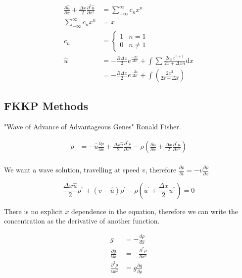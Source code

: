 \documentclass[a4paper]{article}
\begin{document}
\begin{align*}
 \frac{\partial \hat{u}}{\partial x} + \frac{\Delta x}{2} \frac{\partial ^2 \hat{u}}{\partial x^2} & = \sum _{- \infty} ^{\infty} c_n x^n \\ 
 \sum _{- \infty} ^{\infty} c_n x^n & = x \\
 c_n & =  \begin{cases}
1 & n = 1 \\
0 & n \neq 1		
\end{cases} \\
\hat{u} & =  - \frac{B \Delta x}{2} e^{\frac{-2 x}{\Delta x} } + \int \sum	 \frac{2 c_n x^{n+1}}{2x + \Delta x n } \mathrm{d} x \\
& = - \frac{B \Delta x}{2} e^{\frac{-2 x}{\Delta x} } + \int \left( \frac{2 x^2}{2 x + \Delta x} \right)
\end{align*}

\newpage

\subsection{FKKP Methods}

"Wave of Advance of Advantageous Genes" Ronald Fisher. 

\begin{align*}
\dot{\rho} & = - \hat{u} \frac{\partial \rho}{\partial x} + \frac{\Delta x \hat{u}}{2} \frac{\partial ^2 \rho}{\partial x ^2} - \rho \left(\frac{\partial u}{\partial x} + \frac{\Delta x}{2} \frac{\partial ^2 u}{\partial x ^2} \right) \\
\end{align*}

We want a wave solution, travelling at speed $v$, therefore $ \frac{\partial \rho}{\partial t}  = - v \frac{\partial \rho}{\partial x}$ 

\begin{equation}
\frac{\Delta x \hat{u}}{2} \rho ^{''} + ( v - \hat{u} ) \rho ^{'} - \rho \left( u^{'} + \frac{\Delta x}{2} u^{''} \right) = 0 
\end{equation} 

There is no explicit $x$ dependence in the equation, therefore we can write the concentration as the derivative of another function. 

\begin{align*}
g & = - \frac{d \rho}{d x} \\
\frac{\partial g}{\partial x} & = - \frac{\partial ^2 \rho}{\partial x ^2 } \\
\frac{\partial ^2 \rho}{\partial x^2} &= g \frac{\partial g}{\partial \rho} \\
\end{align*}
\end{document}
